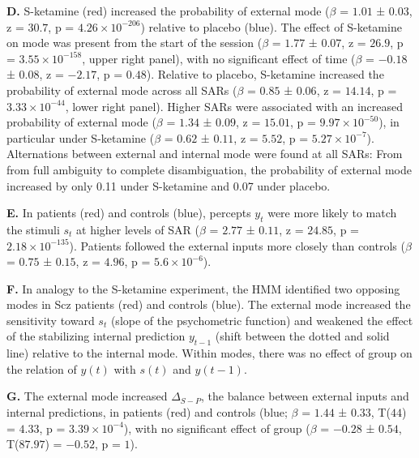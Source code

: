\documentclass[
]{article}
\begin{document}
\textbf{D.} S-ketamine (red) increased the probability of external mode
(\(\beta\) = \(1.01\) ± \(0.03\), z = \(30.7\), p =
\(\ensuremath{4.26\times 10^{-206}}\)) relative to placebo (blue). The
effect of S-ketamine on mode was present from the start of the session
(\(\beta\) = \(1.77\) ± \(0.07\), z = \(26.9\), p =
\(\ensuremath{3.55\times 10^{-158}}\), upper right panel), with no
significant effect of time (\(\beta\) = \(-0.18\) ± \(0.08\), z =
\(-2.17\), p = \(0.48\)). Relative to placebo, S-ketamine increased the
probability of external mode across all SARs (\(\beta\) = \(0.85\) ±
\(0.06\), z = \(14.14\), p = \(\ensuremath{3.33\times 10^{-44}}\), lower
right panel). Higher SARs were associated with an increased probability
of external mode (\(\beta\) = \(1.34\) ± \(0.09\), z = \(15.01\), p =
\(\ensuremath{9.97\times 10^{-50}}\)), in particular under S-ketamine
(\(\beta\) = \(0.62\) ± \(0.11\), z = \(5.52\), p =
\(\ensuremath{5.27\times 10^{-7}}\)). Alternations between external and
internal mode were found at all SARs: From from full ambiguity to
complete disambiguation, the probability of external mode increased by
only 0.11 under S-ketamine and 0.07 under placebo.

\textbf{E.} In patients (red) and controls (blue), percepts \(y_t\) were
more likely to match the stimuli \(s_t\) at higher levels of SAR
(\(\beta\) = \(2.77\) ± \(0.11\), z = \(24.85\), p =
\(\ensuremath{2.18\times 10^{-135}}\)). Patients followed the external
inputs more closely than controls (\(\beta\) = \(0.75\) ± \(0.15\), z =
\(4.96\), p = \(\ensuremath{5.6\times 10^{-6}}\)).

\textbf{F.} In analogy to the S-ketamine experiment, the HMM identified
two opposing modes in Scz patients (red) and controls (blue). The
external mode increased the sensitivity toward \(s_t\) (slope of the
psychometric function) and weakened the effect of the stabilizing
internal prediction \(y_{t-1}\) (shift between the dotted and solid
line) relative to the internal mode. Within modes, there was no effect
of group on the relation of \(y(t)\) with \(s(t)\) and \(y(t-1)\).

\textbf{G.} The external mode increased \(\Delta_{S-P}\), the balance
between external inputs and internal predictions, in patients (red) and
controls (blue; \(\beta\) = \(1.44\) ± \(0.33\), T(\(44\)) = \(4.33\), p
= \(\ensuremath{3.39\times 10^{-4}}\)), with no significant effect of
group (\(\beta\) = \(-0.28\) ± \(0.54\), T(\(87.97\)) = \(-0.52\), p =
\(1\)).
\end{document}
